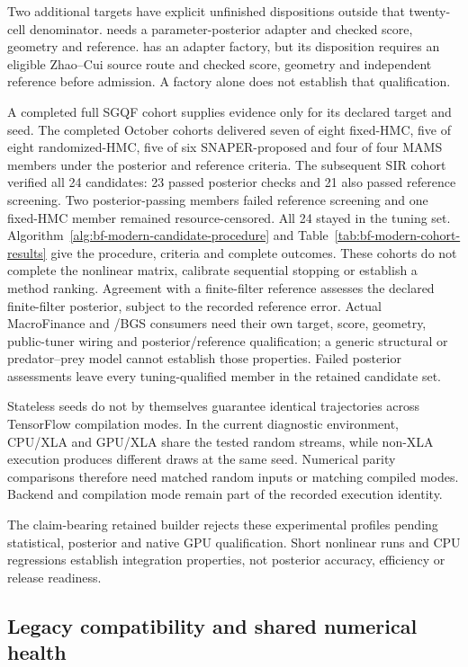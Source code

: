 Two additional targets have explicit unfinished dispositions outside that
twenty-cell denominator.  needs a parameter-posterior adapter
and checked score, geometry and reference.  has an adapter factory,
but its  disposition requires an eligible
Zhao--Cui source route and checked score, geometry and independent reference
before admission. A factory alone does not establish that qualification.

A completed full SGQF cohort supplies evidence only for its declared target
and seed. The completed October cohorts delivered seven of eight fixed-HMC,
five of eight randomized-HMC, five of six SNAPER-proposed and four of four
MAMS members under the posterior and reference criteria. The subsequent SIR
cohort verified all 24 candidates: 23 passed posterior checks and 21 also
passed reference screening. Two posterior-passing members failed reference screening and one
fixed-HMC member remained resource-censored. All 24 stayed in the tuning set.
Algorithm~\ref{alg:bf-modern-candidate-procedure} and
Table~\ref{tab:bf-modern-cohort-results} give the procedure, criteria and
complete outcomes. These cohorts do not complete the nonlinear matrix,
calibrate sequential stopping or establish a method ranking. Agreement with a finite-filter
reference assesses the declared finite-filter posterior, subject to the
recorded reference error. Actual MacroFinance and /BGS
consumers need their own target, score, geometry, public-tuner wiring and
posterior/reference qualification; a generic structural or predator--prey
model cannot establish those properties. Failed posterior assessments leave
every tuning-qualified member in the retained candidate set.

Stateless seeds do not by themselves guarantee identical trajectories across
TensorFlow compilation modes. In the current diagnostic environment, CPU/XLA
and GPU/XLA share the tested random streams, while non-XLA execution produces
different draws at the same seed. Numerical parity comparisons therefore need
matched random inputs or matching compiled modes. Backend and compilation mode
remain part of the recorded execution identity.

The claim-bearing retained builder rejects these experimental profiles pending
statistical, posterior and native GPU qualification. Short nonlinear runs and
CPU regressions establish integration properties, not posterior accuracy,
efficiency or release readiness.

\subsection{Legacy compatibility and shared numerical health}

